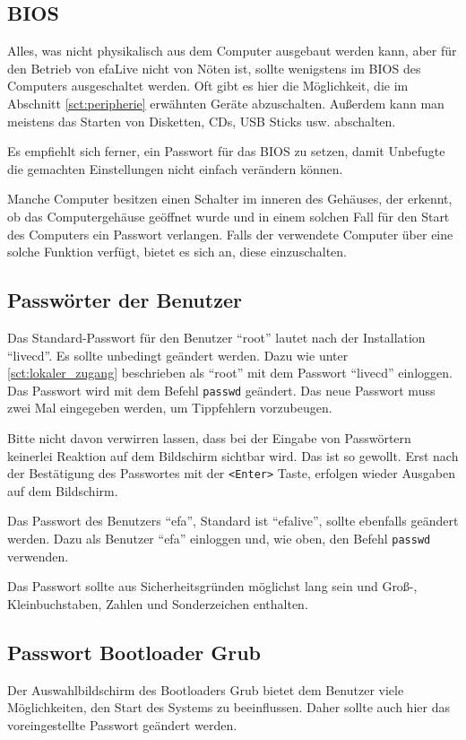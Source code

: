 \documentclass[a4paper,12pt,twoside]{article}
\begin{document}
\subsection{BIOS}
\label{sct:bios}
Alles, was nicht physikalisch aus dem Computer ausgebaut werden kann,
aber für den Betrieb von efaLive nicht von Nöten ist, sollte wenigstens
im BIOS des Computers ausgeschaltet werden. Oft gibt es hier die
Möglichkeit, die im Abschnitt \ref{sct:peripherie} erwähnten Geräte abzuschalten.
Außerdem kann man meistens das Starten von Disketten, CDs, USB Sticks
usw. abschalten.

Es empfiehlt sich ferner, ein Passwort für das BIOS zu setzen, damit
Unbefugte die gemachten Einstellungen nicht einfach verändern können.

Manche Computer besitzen einen Schalter im inneren des Gehäuses, der
erkennt, ob das Computergehäuse geöffnet wurde und in einem solchen
Fall für den Start des Computers ein Passwort verlangen. Falls der
verwendete Computer über eine solche Funktion verfügt, bietet es sich
an, diese einzuschalten.


\subsection{Passwörter der Benutzer}
\label{sct:password_admin}
Das Standard-Passwort für den Benutzer "`root"' lautet nach der Installation
"`livecd"'. Es sollte unbedingt geändert werden. Dazu wie unter \ref{sct:lokaler_zugang} beschrieben als
"`root"' mit dem Passwort "`livecd"' einloggen. Das Passwort wird mit
dem Befehl \texttt{passwd} geändert. Das neue
Passwort muss zwei Mal eingegeben werden, um Tippfehlern vorzubeugen. 

Bitte nicht davon verwirren lassen, dass bei der Eingabe von Passwörtern
keinerlei Reaktion auf dem Bildschirm sichtbar wird. Das ist so
gewollt. Erst nach der Bestätigung des Passwortes mit der
\texttt{{\textless}Enter{\textgreater}} Taste, erfolgen wieder Ausgaben auf dem
Bildschirm.

Das Passwort des Benutzers "`efa"', Standard ist "`efalive"', sollte ebenfalls geändert werden. Dazu 
als Benutzer "`efa"' einloggen und, wie oben, den Befehl \texttt{passwd} verwenden.

Das Passwort sollte aus Sicherheitsgründen möglichst lang sein und
Groß-, Kleinbuchstaben, Zahlen und Sonderzeichen enthalten.


\subsection{Passwort Bootloader Grub}
\label{sct:passwort_grub}
Der Auswahlbildschirm des Bootloaders Grub \cite{GRB1} bietet dem
Benutzer viele Möglichkeiten, den Start des Systems zu beeinflussen.
Daher sollte auch hier das voreingestellte Passwort geändert werden.
\end{document}
